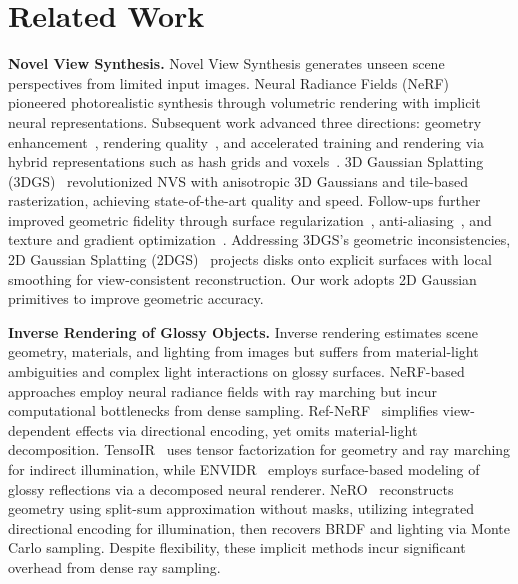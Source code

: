 \section{Related Work}
\label{sec:relat}

\textbf{Novel View Synthesis.}
Novel View Synthesis generates unseen scene perspectives from limited input images. Neural Radiance Fields (NeRF)~\cite{mildenhall2021nerf} pioneered photorealistic synthesis through volumetric rendering with implicit neural representations. Subsequent work advanced three directions: geometry enhancement~\cite{wang2021neus}, rendering quality~\cite{barron2021mipnerf,barron2022mipnerf360}, and accelerated training and rendering via hybrid representations such as hash grids and voxels~\cite{muller2022instantngp,chen2022tensorf}.
3D Gaussian Splatting (3DGS)~\cite{kerbl20233dgs} revolutionized NVS with anisotropic 3D Gaussians and tile-based rasterization, achieving state-of-the-art quality and speed. Follow-ups further improved geometric fidelity through surface regularization~\cite{guedon2024sugar, lu2024scaffold}, anti-aliasing~\cite{yu2024mipsplatting}, and texture and gradient optimization~\cite{yu2024gof, chen2024pgsr}. Addressing 3DGS's geometric inconsistencies, 2D Gaussian Splatting (2DGS)~\cite{huang20242dgs} projects disks onto explicit surfaces with local smoothing for view-consistent reconstruction. Our work adopts 2D Gaussian primitives to improve geometric accuracy.

\noindent\textbf{Inverse Rendering of Glossy Objects.}
Inverse rendering estimates scene geometry, materials, and lighting from images but suffers from material-light ambiguities and complex light interactions on glossy surfaces. NeRF-based approaches employ neural radiance fields with ray marching but incur computational bottlenecks from dense sampling. Ref-NeRF~\cite{verbin2022refnerf} simplifies view-dependent effects via directional encoding, yet omits material-light decomposition. TensoIR~\cite{jin2023tensoir} uses tensor factorization for geometry and ray marching for indirect illumination, while ENVIDR~\cite{liang2023envidr} employs surface-based modeling of glossy reflections via a decomposed neural renderer. NeRO~\cite{liu2023nero} reconstructs geometry using split-sum approximation without masks, utilizing integrated directional encoding for illumination, then recovers BRDF and lighting via Monte Carlo sampling. Despite flexibility, these implicit methods incur significant overhead from dense ray sampling.

